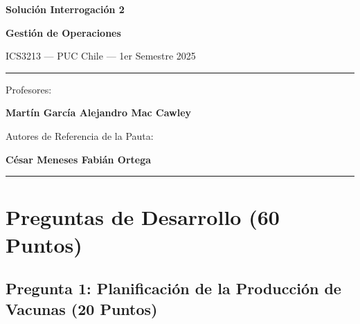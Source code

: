 \documentclass[11pt, a4paper]{article}
\begin{document}
\begin{titlepage}
  \centering
  \vspace*{2cm}
  {\Huge\bfseries\color{gopcyan} Solución Interrogación 2\par}
  \vspace{0.4cm}
  {\LARGE\bfseries Gestión de Operaciones\par}
  \vspace{0.3cm}
  {\large ICS3213 --- PUC Chile --- 1er Semestre 2025\par}
  \vspace{1.2cm}
  \rule{\textwidth}{0.4pt}
  \vspace{0.4cm}

  {\small Profesores:\par}
  {\large\bfseries Martín García \quad Alejandro Mac Cawley\par}
  \vspace{0.3cm}
  {\small Autores de Referencia de la Pauta:\par}
  {\small\textbf{César Meneses \quad Fabián Ortega}\par}
  \vspace{0.4cm}
  \rule{\textwidth}{0.4pt}
  \vspace{1cm}

  \vfill
\end{titlepage}

\newpage

\section{Preguntas de Desarrollo (60 Puntos)}

\subsection*{Pregunta 1: Planificación de la Producción de Vacunas (20 Puntos)}
\end{document}
